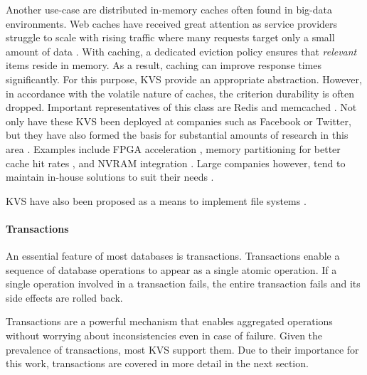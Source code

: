 Another use-case are distributed in-memory caches often found in big-data
environments. Web caches have received great attention as service providers
struggle to scale with rising traffic where many requests target only a small
amount of data \cite{xu2014characterizing}. With caching, a dedicated eviction
policy ensures that \emph{relevant} items reside in memory. As a result,
caching can improve response times significantly. For this purpose, KVS provide
an appropriate abstraction. However, in accordance with the volatile nature of
caches, the criterion durability is often dropped. Important representatives of
this class are Redis \cite{redis2017home} and memcached
\cite{memcached2017home}. Not only have these KVS been deployed at companies
such as Facebook or Twitter, but they have also formed the basis for substantial
amounts of research in this area \cite{xu2014characterizing}. Examples include
FPGA acceleration \cite{lavasani2014fpga}, memory partitioning for better cache
hit rates \cite{carra2014memory}, and NVRAM integration \cite{wu2016nvmcached}.
Large companies however, tend to maintain in-house solutions to suit their needs
\cite{chang2008bigtable, decandia2007dynamo, lakshman2010cassandra,
wang2015hydradb}.


KVS have also been proposed as a means to implement file systems
\cite{murphy2001database, volos2014aerie}.



\paragraph{Transactions}

An essential feature of most databases is transactions. Transactions enable a
sequence of database operations to appear as a single atomic operation. If a
single operation involved in a transaction fails, the entire transaction fails and its side effects are rolled back.

Transactions are a powerful mechanism that enables aggregated operations without
worrying about inconsistencies even in case of failure. Given the prevalence of
transactions, most KVS support them. Due to their importance for this work,
transactions are covered in more detail in the next section.

